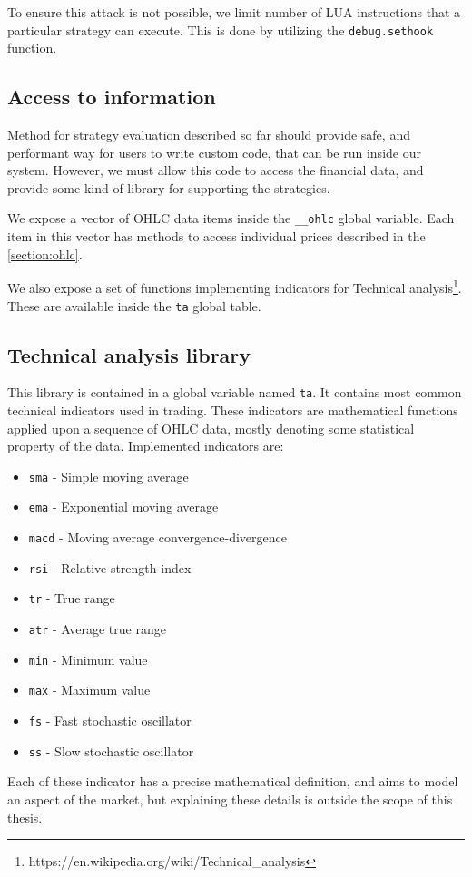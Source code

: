 To ensure this attack is not possible, we limit number of LUA instructions that a particular strategy can execute.
This is done by utilizing the \verb|debug.sethook| function.

\subsection{Access to information}
Method for strategy evaluation described so far should provide safe, and performant
way for users to write custom code, that can be run inside our system. However, we must allow this code to access the
financial data, and provide some kind of library for supporting the strategies.

We expose a vector of OHLC data items inside the \verb|__ohlc| global variable. Each item in this vector
has methods to access individual prices described in the \autoref{section:ohlc}.

We also expose a set of functions implementing indicators for Technical analysis\footnote{https://en.wikipedia.org/wiki/Technical\_analysis}.
These are available inside the \verb|ta| global table.


\subsection{Technical analysis library}
This library is contained in a global variable named \verb|ta|. It contains most common technical indicators used in
trading. These indicators are mathematical functions applied upon a sequence of OHLC data, mostly
denoting some statistical property of the data. Implemented indicators are:
\begin{itemize}
    \item \verb|sma| - Simple moving average
    \item \verb|ema| - Exponential moving average
    \item \verb|macd| - Moving average convergence-divergence
    \item \verb|rsi| - Relative strength index
    \item \verb|tr| - True range
    \item \verb|atr| - Average true range
    \item \verb|min| - Minimum value
    \item \verb|max| -  Maximum value
    \item \verb|fs| - Fast stochastic oscillator
    \item \verb|ss| - Slow stochastic oscillator
\end{itemize}
Each of these indicator has a precise mathematical definition, and aims to model an aspect of the market, but explaining
these details is outside the scope of this thesis.

